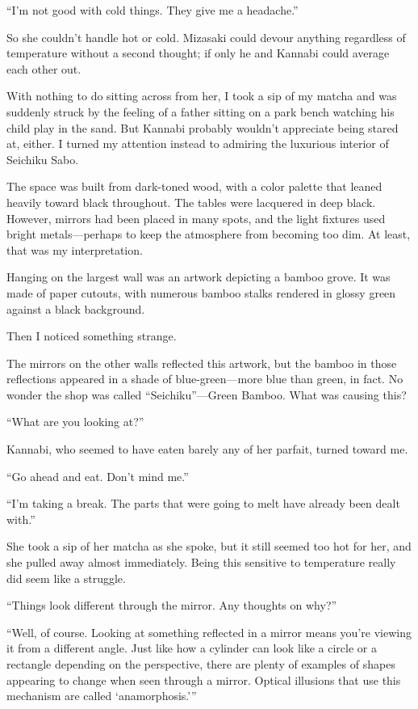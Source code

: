 \documentclass[
    a4paper,
    12pt,
    twoside,
    openany,
    UTF8,
    fontset=windows
]{ctexbook}
\begin{document}
``I'm not good with cold things. They give me a headache.''

So she couldn't handle hot or cold. Mizasaki could devour anything regardless of temperature without a second thought; if only he and Kannabi could average each other out.

With nothing to do sitting across from her, I took a sip of my matcha and was suddenly struck by the feeling of a father sitting on a park bench watching his child play in the sand. But Kannabi probably wouldn't appreciate being stared at, either. I turned my attention instead to admiring the luxurious interior of Seichiku Sabo.

The space was built from dark-toned wood, with a color palette that leaned heavily toward black throughout. The tables were lacquered in deep black. However, mirrors had been placed in many spots, and the light fixtures used bright metals---perhaps to keep the atmosphere from becoming too dim. At least, that was my interpretation.

Hanging on the largest wall was an artwork depicting a bamboo grove. It was made of paper cutouts, with numerous bamboo stalks rendered in glossy green against a black background.

Then I noticed something strange.

The mirrors on the other walls reflected this artwork, but the bamboo in those reflections appeared in a shade of blue-green---more blue than green, in fact. No wonder the shop was called ``Seichiku''---Green Bamboo. What was causing this?

``What are you looking at?''

Kannabi, who seemed to have eaten barely any of her parfait, turned toward me.

``Go ahead and eat. Don't mind me.''

``I'm taking a break. The parts that were going to melt have already been dealt with.''

She took a sip of her matcha as she spoke, but it still seemed too hot for her, and she pulled away almost immediately. Being this sensitive to temperature really did seem like a struggle.

``Things look different through the mirror. Any thoughts on why?''

``Well, of course. Looking at something reflected in a mirror means you're viewing it from a different angle. Just like how a cylinder can look like a circle or a rectangle depending on the perspective, there are plenty of examples of shapes appearing to change when seen through a mirror. Optical illusions that use this mechanism are called `anamorphosis.'''
\end{document}
